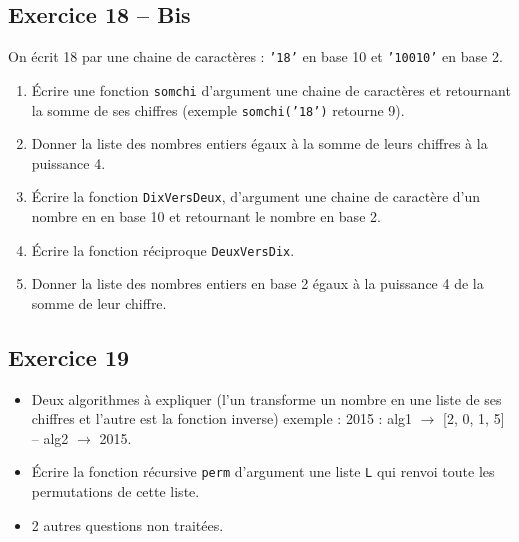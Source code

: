 \documentclass[10pt,fleqn]{article} %
\begin{document}
\begin{multicols}{2}
\subsection*{Exercice 18 -- Bis}
On écrit 18 par une chaine de caractères : \texttt{'18'} en base 10 et \texttt{'10010'} en base 2. 
\begin{enumerate}
\item Écrire une fonction \texttt{somchi} d'argument une chaine de caractères et retournant la somme de ses chiffres  (exemple \texttt{somchi('18')} retourne 9).
\item Donner la liste des nombres entiers égaux à la somme de leurs chiffres à la puissance 4. 
\item Écrire la fonction \texttt{DixVersDeux}, d'argument une chaine de caractère d'un nombre en en base 10 et retournant le nombre en base 2. 
\item Écrire la fonction réciproque \texttt{DeuxVersDix}.
\item Donner la liste des nombres entiers en base 2 égaux à la puissance 4 de la somme de leur chiffre.
\end{enumerate}


\subsection*{Exercice 19}

\begin{itemize}
\item Deux algorithmes à expliquer (l’un transforme un nombre en une liste de ses chiffres et
l’autre est la fonction inverse) exemple : 2015 : alg1 $\rightarrow$  [2, 0, 1, 5] --  alg2  $\rightarrow$ 2015.
\item Écrire la fonction récursive \texttt{perm} d’argument une liste \texttt{L} qui renvoi toute les permutations
de cette liste.
\item 2 autres questions non traitées.
\end{itemize}


\end{multicols}
\end{document}
